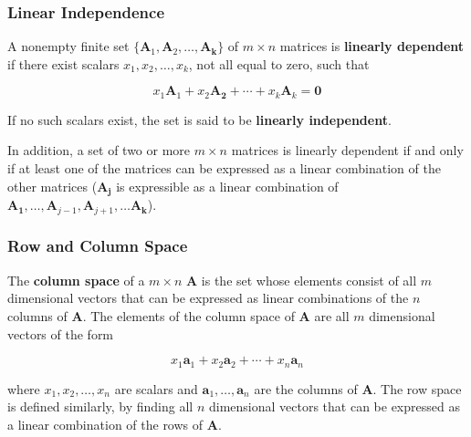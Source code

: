 \documentclass{beamer}
\begin{document}
\begin{frame}
\frametitle{Linear Independence}
A nonempty finite set $\{\mathbf{A}_1, \mathbf{A}_2, \hdots, \mathbf{A_k}\}$ of $m \times n$ matrices is \textbf{linearly dependent} if there exist scalars $x_1, x_2, \hdots, x_k$, not all equal to zero, such that

\[x_1\mathbf{A}_1 + x_2\mathbf{A_2} + \cdots + x_k\mathbf{A}_k = \mathbf{0}\]

If no such scalars exist, the set is said to be \textbf{linearly independent}. 
\vspace{5mm}

In addition, a set of two or more $m \times n$ matrices is linearly dependent if and only if at least one of the matrices can be expressed as a linear combination of the other matrices ($\mathbf{A_j}$ is expressible as a linear combination of $\mathbf{A_1}, \hdots, \mathbf{A}_{j-1}, \mathbf{A}_{j+1}, \hdots \mathbf{A_k}$).
\end{frame}

\begin{frame}
\frametitle{Row and Column Space}
The \textbf{column space} of a $m \times n$ $\mathbf{A}$ is the set whose elements consist of all $m$ dimensional vectors that can be expressed as linear combinations of the $n$ columns of $\mathbf{A}$.  The elements of the column space of $\mathbf{A}$ are all $m$ dimensional vectors of the form

\[x_1 \mathbf{a}_1 + x_2\mathbf{a}_2 + \cdots + 
x_n\mathbf{a}_n\]

where $x_1, x_2, \hdots, x_n$ are scalars and $\mathbf{a}_1, \hdots, \mathbf{a}_n$ are the columns of $\mathbf{A}$.  The row space is defined similarly, by finding all $n$ dimensional vectors that can be expressed as a linear combination of the rows of $\mathbf{A}$. 
\end{frame}
\end{document}
